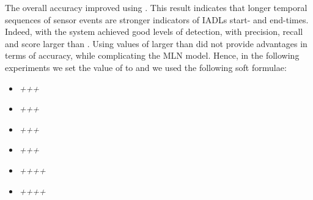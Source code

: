 \documentclass[10pt, conference, compsocconf]{IEEEtran}
\begin{document}
The overall accuracy improved using . This result indicates that longer
temporal sequences of sensor events are stronger indicators of IADLs start-
and end-times. Indeed, with  the system achieved good levels of detection,
with precision, recall and  score larger than . Using values of  larger
than  did not provide advantages in terms of accuracy, while complicating the MLN model. 
Hence, in the following experiments we set the value of  to  and
we used the following soft formulae:
\begin{itemize}
\item \textit{+}\textit{+}\textit{+}
\item \textit{+}\textit{+}\textit{+}
\item \textit{+}\textit{+}\textit{+}
\item \textit{+}\textit{+}\textit{+}
\item \textit{+}\textit{+}\textit{+}\textit{+}
\item \textit{+}\textit{+}\textit{+}\textit{+}
\end{itemize}
\end{document}
